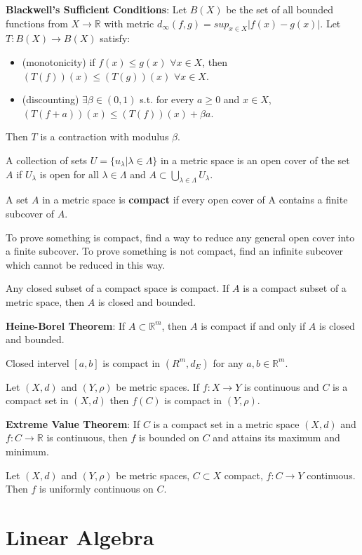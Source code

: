\documentclass[11pt]{article} %
\begin{document}
\textbf{Blackwell's Sufficient Conditions}: Let $B(X)$ be the set of all bounded functions from $X \rightarrow \mathbb{R}$ with metric $d_{\infty}(f,g) = sup_{x\in X} |f(x) - g(x)|$. Let $T:B(X) \rightarrow B(X)$ satisfy:
\begin{itemize}
\item (monotonicity) if $f(x) \leq g(x)$ $\forall x \in X$, then $(T(f))(x) \leq (T(g))(x)$ $\forall x \in X$.
\item (discounting) $\exists \beta \in (0,1)$ s.t. for every $a \geq 0$ and $x \in X$, $(T(f+a))(x) \leq (T(f))(x) + \beta a$.
\end{itemize}
Then $T$ is a contraction with modulus $\beta$.

A collection of sets $U = \{u_{\lambda}|\lambda \in \Lambda \}$ in a metric space is an open cover of the set $A$ if $U_{\lambda}$ is open for all $\lambda \in \Lambda$ and $A \subset \bigcup_{\lambda \in \Lambda} U_{\lambda}.$

A set $A$ in a metric space is \textbf{compact} if every open cover of A contains a finite subcover of $A$.

To prove something is compact, find a way to reduce any general open cover into a finite subcover. To prove something is not compact, find an infinite subcover which cannot be reduced in this way.

Any closed subset of a compact space is compact.
If $A$ is a compact subset of a metric space, then $A$ is closed and bounded.

\textbf{Heine-Borel Theorem}: If $A \subset \mathbb{R}^m$, then $A$ is compact if and only if $A$ is closed and bounded.

Closed intervel $[a,b]$ is compact in $(R^m,d_E)$ for any $a,b \in \mathbb{R}^m$.

Let $(X,d)$ and $(Y,\rho)$ be metric spaces. If $f: X \rightarrow Y$ is continuous and $C$ is a compact set in $(X,d)$ then $f(C)$ is compact in $(Y,\rho).$

\textbf{Extreme Value Theorem}: If $C$ is a compact set in a metric space $(X,d)$ and $f:C \rightarrow \mathbb{R}$ is continuous, then $f$ is bounded on $C$ and attains its maximum and minimum.

Let $(X,d)$ and $(Y,\rho)$ be metric spaces, $C \subset X$ compact, $f:C \rightarrow Y$ continuous. Then $f$ is uniformly continuous on $C$.

\section{Linear Algebra}
\end{document}

